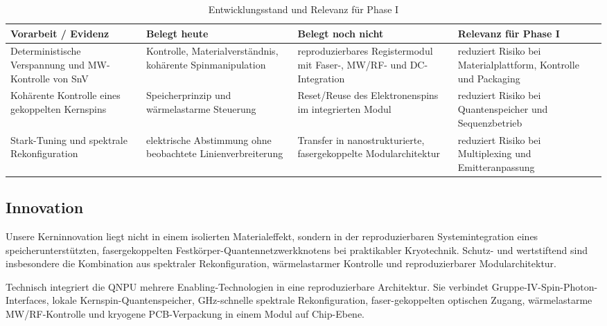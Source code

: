 \documentclass[11pt,oneside]{scrartcl}
\begin{document}
\begin{table}[ht]
\centering
\small
\begin{tabularx}{\textwidth}{>{\raggedright\arraybackslash}p{} X X X}
\toprule
Vorarbeit / Evidenz & Belegt heute & Belegt noch nicht & Relevanz f\"ur Phase I \\
\midrule
Deterministische Verspannung und MW-Kontrolle von SnV & Kontrolle, Materialverst\"andnis, koh\"arente Spinmanipulation & reproduzierbares Registermodul mit Faser-, MW/RF- und DC-Integration & reduziert Risiko bei Materialplattform, Kontrolle und Packaging \\
Koh\"arente Kontrolle eines gekoppelten Kernspins & Speicherprinzip und w\"armelastarme Steuerung & Reset/Reuse des Elektronenspins im integrierten Modul & reduziert Risiko bei Quantenspeicher und Sequenzbetrieb \\
Stark-Tuning und spektrale Rekonfiguration & elektrische Abstimmung ohne beobachtete Linienverbreiterung & Transfer in nanostrukturierte, fasergekoppelte Modularchitektur & reduziert Risiko bei Multiplexing und Emitteranpassung \\
\bottomrule
\end{tabularx}
\caption{Entwicklungsstand und Relevanz f\"ur Phase I}
\end{table}

\subsection{Innovation}
Unsere Kerninnovation liegt nicht in einem isolierten Materialeffekt, sondern in der reproduzierbaren Systemintegration eines speicherunterst\"utzten, fasergekoppelten Festk\"orper-Quantennetzwerkknotens bei praktikabler Kryotechnik. Schutz- und wertstiftend sind insbesondere die Kombination aus spektraler Rekonfiguration, w\"armelastarmer Kontrolle und reproduzierbarer Modularchitektur.

Technisch integriert die QNPU mehrere Enabling-Technologien in eine reproduzierbare Architektur. Sie verbindet Gruppe-IV-Spin-Photon-Interfaces, lokale Kernspin-Quantenspeicher, GHz-schnelle spektrale Rekonfiguration, faser-gekoppelten optischen Zugang, w\"armelastarme MW/RF-Kontrolle und kryogene PCB-Verpackung in einem Modul auf Chip-Ebene.
\end{document}

